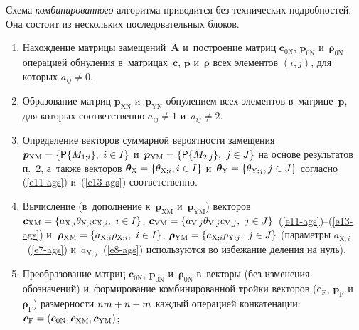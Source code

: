 \begin{multicols}{2}
  Схема \textit{комбинированного} алгоритма приводится без технических 
подробностей. Она состоит из нескольких последовательных блоков. 
  \begin{enumerate}[1.]
  \item  Нахождение матрицы замещений~$\mathbf{A}$ и~по\-стро\-ение матриц 
$\boldsymbol{c}_{0\mathrm{N}}$, $\boldsymbol{p}_{0\mathrm{N}}$ 
и~$\boldsymbol{\rho}_{0\mathrm{N}}$ операцией обнуления  
в~мат\-ри\-цах~$\boldsymbol{c}$, $\boldsymbol{p}$ и~$\boldsymbol{\rho}$ всех 
элементов $(i,j)$, для которых $a_{ij}\not= 0$. 
  \item Образование матриц $\boldsymbol{p}_{\mathrm{XN}}$ 
и~$\boldsymbol{p}_{\mathrm{YN}}$ обнулением всех элементов  
в~мат\-ри\-це~$\boldsymbol{p}$, для которых соответственно $a_{ij}\not=1$ 
и~$a_{ij}\not= 2$. 
  \item  Определение векторов суммарной вероятности замещения 
$\boldsymbol{p}_{\mathrm{XM}}\hm = \left\{ {\sf P}\{M_{1;i}\},\ i \hm\in I\right\}$ 
и~$\boldsymbol{p}_{\mathrm{YM}}\hm = \left\{ {\sf P}\{ M_{2;j}\},\ j \hm\in J\right\}$ 
на основе результатов п.~2, а~также векторов 
$\boldsymbol{\theta}_{\mathrm{X}}\hm = \left\{\theta_{\mathrm{X};i}, 
i \hm\in I\right\}$ 
и~$\boldsymbol{\theta}_{\mathrm{Y}}\hm = \left\{\theta_{\mathrm{Y};j}, 
j \hm\in J\right\}$ согласно (\ref{e11-ags}) и~(\ref{e13-ags}) соответственно. 
  \item  Вычисление (в~дополнение к~$\boldsymbol{p}_{\mathrm{XM}}$ 
и~$\boldsymbol{p}_{\mathrm{YM}}$) векторов 
$\boldsymbol{c}_{\mathrm{XM}}\hm= \{a_{\mathrm{X};i} 
\theta_{\mathrm{X};i}c_{\mathrm{X};i},\ i\hm\in I\}$,
  $\boldsymbol{c}_{\mathrm{YM}}\hm= \{a_{\mathrm{Y};j} 
\theta_{\mathrm{Y};j}c_{\mathrm{Y};j},\  
j\hm\in J\}$~(\ref{e11-ags})--(\ref{e13-ags}) 
и~$\boldsymbol{\rho}_{\mathrm{XM}}\hm= \{ a_{\mathrm{X};i} 
\rho_{\mathrm{X};i},\ i\hm\in I\}$, $\boldsymbol{\rho}_{\mathrm{YM}}\hm= \{ 
a_{\mathrm{X};i}\rho_{\mathrm{Y};j}, \ j\hm\in J\}$ (параметры 
$a_{\mathrm{X};i}$~(\ref{e7-ags}) и~$a_{\mathrm{Y};j}$~(\ref{e8-ags}) 
используются во избежание деления на нуль).
  \item Преобразование матриц $\boldsymbol{c}_{\mathrm{0N}}$, 
$\boldsymbol{p}_{\mathrm{0N}}$ и~$\boldsymbol{\rho}_{\mathrm{0N}}$ 
в~векторы (без изменения обозначений) и~формирование комбинированной 
тройки векторов ($\boldsymbol{c}_{\mathrm{F}}$, 
$\boldsymbol{p}_{\mathrm{F}}$ и~$\boldsymbol{\rho}_{\mathrm{F}}$) 
размерности $nm \hm+ n \hm+ m$ каждый операцией конкатенации: 
$\boldsymbol{c}_{\mathrm{F}}\hm= (\boldsymbol{c}_{\mathrm{0N}}, 
\boldsymbol{c}_{\mathrm{XM}}, \boldsymbol{c}_{\mathrm{YM}})$; 

\end{enumerate}
\end{multicols}
